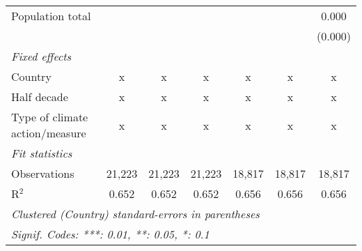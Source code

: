 \begin{tabular}{lcccccc}
   Population total                         &         &                &                &               &               & 0.000\\   
                                            &         &                &                &               &               & (0.000)\\   
   \emph{Fixed effects}\\
   Country                                  & x       & x              & x              & x             & x             & x\\  
   Half decade                              & x       & x              & x              & x             & x             & x\\  
   Type of climate action/measure           & x       & x              & x              & x             & x             & x\\  
   \midrule \emph{Fit statistics}\\
   Observations                             & 21,223  & 21,223         & 21,223         & 18,817        & 18,817        & 18,817\\  
   R$^2$                                    & 0.652   & 0.652          & 0.652          & 0.656         & 0.656         & 0.656\\  
   \midrule
   \multicolumn{7}{l}{\emph{Clustered (Country) standard-errors in parentheses}}\\
   \multicolumn{7}{l}{\emph{Signif. Codes: ***: 0.01, **: 0.05, *: 0.1}}\\
\end{tabular}
\par\endgroup


